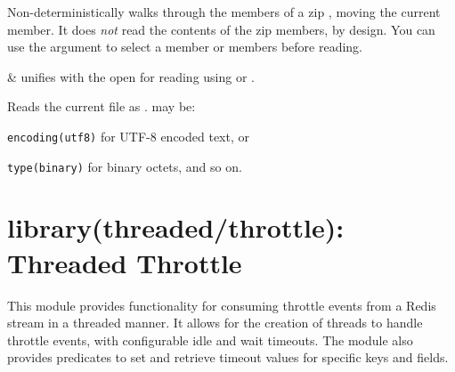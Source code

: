 \begin{description}
Non-deterministically walks through the members of a zip ,
moving the  current member. It does \textit{not} read the contents of
the zip members, by design. You can use the  argument to select
a member or members before reading.

\begin{arguments}
 & unifies with the open  for reading using
 or . \\
\end{arguments}

Reads the current  file as .  may be:

\begin{shortlist}
    \item \verb$encoding(utf8)$ for UTF-8 encoded text, or
    \item \verb$type(binary)$ for binary octets, and so on.
\end{shortlist}
\end{description}

\chapter{library(threaded/throttle): Threaded Throttle}\label{sec:throttle}

This module provides functionality for consuming throttle events from
a Redis stream in a threaded manner. It allows for the creation of
threads to handle throttle events, with configurable idle and wait
timeouts. The module also provides predicates to set and retrieve
timeout values for specific keys and fields.\vspace{0.7cm}

